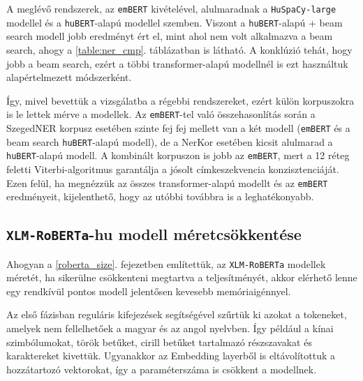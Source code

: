 \documentclass{llncs}
\newcommand{\embert}{\texttt{emBERT}}
\newcommand{\hubert}{\texttt{huBERT}}
\newcommand{\huspacyl}{\texttt{HuSpaCy-large}}
\newcommand{\roberta}{\texttt{XLM-RoBERTa}}
\newcommand{\trf}{transformer}
\begin{document}
A meglévő rendszerek, az \embert{} kivételével, alulmaradnak a \huspacyl{} modellel és a \hubert{}-alapú modellel szemben. Viszont a \hubert{}-alapú + beam search modell jobb eredményt ért el, mint ahol nem volt alkalmazva a beam search, ahogy a \ref{table:ner_cmp}. táblázatban is látható. A konklúzió tehát, hogy jobb a beam search, ezért a többi \trf{}-alapú modellnél is ezt használtuk alapértelmezett módszerként.

Így, mivel bevettük a vizsgálatba a régebbi rendszereket, ezért külön korpuszokra is le lettek mérve a modellek. Az \embert{}-tel való összehasonlítás során a SzegedNER korpusz esetében szinte fej fej mellett van a két modell (\embert{} és a beam search \hubert{}-alapú modell), de a NerKor esetében kicsit alulmarad a \hubert{}-alapú modell. A kombinált korpuszon is jobb az \embert{}, mert a 12 réteg feletti Viterbi-algoritmus garantálja a jósolt címkeszekvencia konzisztenciáját. Ezen felül, ha megnézzük az összes \trf{}-alapú modellt és az \embert{} eredményeit, kijelenthető, hogy az utóbbi továbbra is a leghatékonyabb.

\subsection{\roberta{}-hu modell méretcsökkentése}

Ahogyan a \ref{roberta_size}. fejezetben említettük, az \roberta{} modellek méretét, ha sikerülne csökkenteni megtartva a teljesítményét, akkor elérhető lenne egy rendkívül pontos modell jelentősen kevesebb memóriaigénnyel.

Az első fázisban reguláris kifejezések segítségével szűrtük ki azokat a tokeneket, amelyek nem fellelhetőek a magyar és az angol nyelvben. Így például a kínai szimbólumokat, török betűket, cirill betűket tartalmazó részszavakat és karaktereket kivettük. Ugyanakkor az Embedding layerből is eltávolítottuk a hozzátartozó vektorokat, így a paraméterszáma is csökkent a modellnek.
\end{document}
